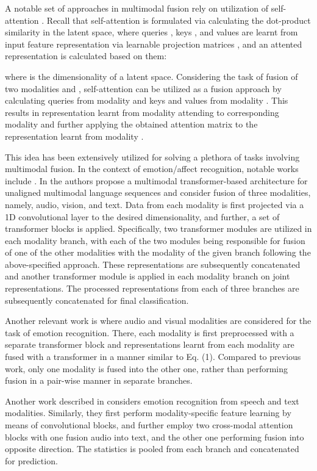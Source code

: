 \documentclass[a4paper,conference]{IEEEtran}
\begin{document}
A notable set of approaches in multimodal fusion rely on utilization of self-attention \cite{vaswani}. Recall that self-attention is formulated via calculating the dot-product similarity in the latent space, where queries ,  keys , and values  are learnt from input feature representation via learnable projection matrices , and an attented representation is calculated based on them: 

 
where  is the dimensionality of a latent space. Considering the task of fusion of two modalities  and , self-attention can be utilized as a fusion approach by calculating queries from modality  and keys and values from modality . This results in representation learnt from modality  attending to corresponding modality  and further applying the obtained attention matrix to the representation learnt from modality . 

This idea has been extensively utilized for solving a plethora of tasks involving multimodal fusion. In the context of emotion/affect recognition, notable works include \cite{mult, icasspav, interspeech}. In \cite{mult} the authors propose a multimodal transformer-based architecture for unaligned multimodal language sequences and consider fusion of three modalities, namely, audio, vision, and text. Data from each modality is first projected via a 1D convolutional layer to the desired dimensionality, and further, a set of transformer blocks is applied. Specifically, two transformer modules are utilized in each modality branch, with each of the two modules being responsible for fusion of one of the other modalities with the modality of the given branch following the above-specified approach. These representations are subsequently concatenated and another transformer module is applied in each modality branch on joint representations. The processed representations from each of three branches are subsequently concatenated for final classification.

Another relevant work is \cite{icasspav} where audio and visual modalities are considered for the task of emotion recognition. There, each modality is first preprocessed with a separate transformer block and representations learnt from each modality are fused with a transformer in a manner similar to Eq. (1). Compared to previous work, only one modality is fused into the other one, rather than performing fusion in a pair-wise manner in separate branches. 

Another work described in \cite{interspeech} considers emotion recognition from speech and text modalities. Similarly, they first perform modality-specific feature learning by means of convolutional blocks, and further employ two cross-modal attention blocks with one fusion audio into text, and the other one performing fusion into opposite direction. The statistics is pooled from each branch and concatenated for prediction.
\end{document}
